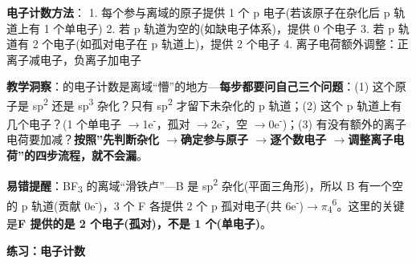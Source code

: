 \documentclass[a4paper,11pt]{ctexart}
\newcommand{\箭}{\ensuremath{\rightarrow}}
\newcommand{\左箭}{\ensuremath{\leftarrow}}
\newcommand{\上箭}{\ensuremath{\uparrow}}
\newcommand{\下箭}{\ensuremath{\downarrow}}
\newcommand{\衡}{\ensuremath{\rightleftharpoons}}
\newcommand{\双箭}{\ensuremath{\leftrightarrow}}
\newcommand{\约等于}{\ensuremath{\approx}}
\newcommand{\小于等于}{\ensuremath{\leq}}
\newcommand{\大于等于}{\ensuremath{\geq}}
\newcommand{\不等于}{\ensuremath{\neq}}
\newcommand{\西格马}{\ensuremath{\sigma}}
\newcommand{\派}{\ensuremath{\pi}}
\begin{document}
\textbf{电子计数方法}：
1. 每个参与离域的原子提供 1 个 p 电子(若该原子在杂化后 p 轨道上有 1 个单电子)
2. 若 p 轨道为空的(如缺电子体系)，提供 0 个电子
3. 若 p 轨道有 2 个电子(如孤对电子在 p 轨道上)，提供 2 个电子
4. 离子电荷额外调整：正离子减电子，负离子加电子

\textbf{教学洞察}： 的电子计数是离域``懵''的地方---\textbf{每步都要问自己三个问题}：(1) 这个原子是 sp\textsuperscript{2} 还是 sp\textsuperscript{3} 杂化？只有 sp\textsuperscript{2} 才留下未杂化的 p 轨道；(2) 这个 p 轨道上有几个电子？(1 个单电子 \箭 1e\textsuperscript{-}，孤对 \箭 2e\textsuperscript{-}，空 \箭 0e\textsuperscript{-})；(3) 有没有额外的离子电荷要加减？\textbf{按照''先判断杂化 \箭 确定参与原子 \箭 逐个数电子 \箭 调整离子电荷''的四步流程，就不会漏}。

\textbf{易错提醒}：BF\textsubscript{3} 的离域``滑铁卢''---B 是 sp\textsuperscript{2} 杂化(平面三角形)，所以 B 有一个空的 p 轨道(贡献 0e\textsuperscript{-})，3 个 F 各提供 2 个 p 孤对电子(共 6e\textsuperscript{-})\箭 \派\textsubscript{4}\textsuperscript{6}。这里的关键是\textbf{F 提供的是 2 个电子(孤对)，不是 1 个(单电子)}。

\textbf{练习： 电子计数}
\end{document}
